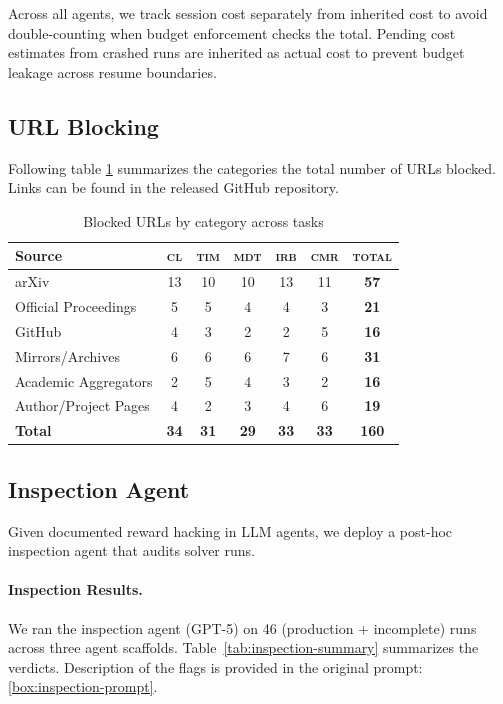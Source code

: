 \documentclass[11pt]{article}
\newcommand{\kw}[1]{{\textsc{\MakeLowercase{#1}}}}
\theoremstyle{plain}
\theoremstyle{definition}
\theoremstyle{remark}
\begin{document}
Across all agents, we track session cost separately from inherited cost to avoid double-counting when budget enforcement checks the total. Pending cost estimates from crashed runs are inherited as actual cost to prevent budget leakage across resume boundaries.

\subsection{URL Blocking} \label{app:url-blocking}

Following table \ref{tab:blocked-urls-categories} summarizes the categories the total number of URLs blocked. Links can be found in the released GitHub repository.

\begin{table}[h]
\centering
\begin{tabular}{lcccccc}
\toprule
Source & \kw{cl} & \kw{tim} & \kw{mdt} & \kw{irb} & \kw{cmr} & \kw{Total} \\
\midrule
arXiv & 13 & 10 & 10 & 13 & 11 & \textbf{57} \\
Official Proceedings & 5 & 5 & 4 & 4 & 3 & \textbf{21} \\
GitHub & 4 & 3 & 2 & 2 & 5 & \textbf{16} \\
Mirrors/Archives & 6 & 6 & 6 & 7 & 6 & \textbf{31} \\
Academic Aggregators & 2 & 5 & 4 & 3 & 2 & \textbf{16} \\
Author/Project Pages & 4 & 2 & 3 & 4 & 6 & \textbf{19} \\
\midrule
\textbf{Total} & \textbf{34} & \textbf{31} & \textbf{29} & \textbf{33} & \textbf{33} & \textbf{160} \\
\bottomrule
\end{tabular}
\caption{Blocked URLs by category across tasks}
\label{tab:blocked-urls-categories}
\end{table}

\subsection{Inspection Agent} \label{app:inspection-agent}

Given documented reward hacking in LLM agents, we deploy a post-hoc inspection agent that audits solver runs. 

\paragraph{Inspection Results.} We ran the inspection agent (GPT-5) on 46 (production + incomplete) runs across three agent scaffolds. Table~\ref{tab:inspection-summary} summarizes the verdicts. Description of the flags is provided in the original prompt:  \ref{box:inspection-prompt}.
\end{document}
